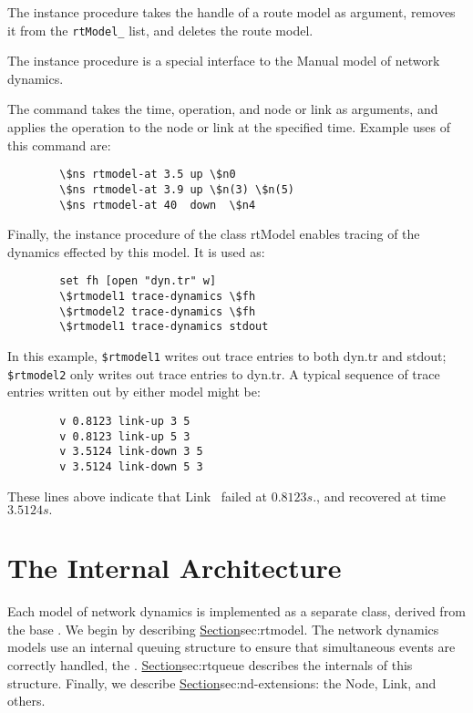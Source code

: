 \begin{list}{---}{}
\item The instance procedure
takes the handle of a route model as argument, removes it from the
{\tt rtModel\_} list, and deletes the route model.

\item The instance procedure
is a special interface to the Manual model of network dynamics.

The command takes the time, operation, and node or link as arguments,
and applies the operation to the node or link at the specified time.
Example uses of this command are:
\begin{verbatim}
        \$ns rtmodel-at 3.5 up \$n0
        \$ns rtmodel-at 3.9 up \$n(3) \$n(5)
        \$ns rtmodel-at 40  down  \$n4
\end{verbatim}
\end{list}

Finally, the instance procedure  of the class rtModel
enables tracing of the dynamics effected by this model.
It is used as:
\begin{verbatim}
        set fh [open "dyn.tr" w]
        \$rtmodel1 trace-dynamics \$fh
        \$rtmodel2 trace-dynamics \$fh
        \$rtmodel1 trace-dynamics stdout
\end{verbatim}
In this example, {\tt \$rtmodel1} writes out trace entries to both
dyn.tr and stdout; {\tt \$rtmodel2} only writes out trace entries to dyn.tr.
A typical sequence of trace entries written out by either model might be:
{\small
\begin{verbatim}
        v 0.8123 link-up 3 5
        v 0.8123 link-up 5 3
        v 3.5124 link-down 3 5
        v 3.5124 link-down 5 3
\end{verbatim}
}
These lines above indicate that Link~ failed at $0.8123s.$,
and recovered at time $3.5124s.$

\section{The Internal Architecture}
\label{sec:nd-internal-arch}

Each model of network dynamics is implemented as a separate class,
derived from the base .
We begin by describing
\href{the base class rtModel and the derived classes}{Section}{sec:rtmodel}.
The network dynamics models use an internal queuing structure
to ensure that simultaneous events are correctly handled,
the .
\href{The next subsection}{Section}{sec:rtqueue}
describes the internals of this structure.
Finally, we describe
\href{the extensions to the existing classes}{Section}{sec:nd-extensions}:
the Node, Link, and others.

